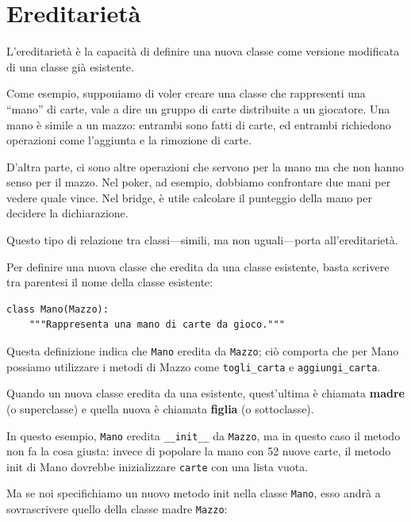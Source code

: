 \documentclass[10pt]{book}
\begin{document}
\section{Ereditarietà}

L'ereditarietà è la capacità di definire una nuova classe come versione modificata di una classe già esistente.

Come esempio, supponiamo di voler creare una classe che rappresenti una ``mano'' di carte, vale a dire un gruppo di carte distribuite a un giocatore. Una mano è simile a un mazzo: entrambi sono fatti di carte, ed entrambi richiedono operazioni come l'aggiunta e la rimozione di carte.

D'altra parte, ci sono altre operazioni che servono per la mano ma che non hanno senso per il mazzo. Nel poker, ad esempio, dobbiamo  confrontare due mani per vedere quale vince. Nel bridge, è utile calcolare il punteggio della mano per decidere la dichiarazione.

Questo tipo di relazione tra classi---simili, ma non uguali---porta all'ereditarietà.

Per definire una nuova classe che eredita da una classe esistente, basta scrivere tra parentesi il nome della classe esistente:

\begin{verbatim}
class Mano(Mazzo):
    """Rappresenta una mano di carte da gioco."""
\end{verbatim}
%
Questa definizione indica che {\tt Mano} eredita da {\tt Mazzo};
ciò comporta che per Mano possiamo utilizzare i metodi di Mazzo come \verb"togli_carta" e \verb"aggiungi_carta".

Quando un nuova classe eredita da una esistente, quest'ultima è chiamata {\bf madre} (o superclasse) e quella nuova è chiamata {\bf figlia} (o sottoclasse).

In questo esempio, {\tt Mano} eredita \verb"__init__" da {\tt Mazzo}, ma in questo caso il metodo non fa la cosa giusta: invece di popolare la mano con 52 nuove carte, il metodo init di Mano dovrebbe inizializzare {\tt carte} con una lista vuota.

Ma se noi specifichiamo un nuovo metodo init nella classe {\tt Mano}, esso andrà a sovrascrivere quello della classe madre {\tt Mazzo}:
\end{document}

